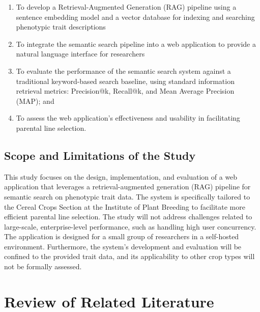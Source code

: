 \documentclass[journal]{./IEEE/IEEEtran}
\begin{document}
\begin{enumerate}
    \item To develop a Retrieval-Augmented Generation (RAG) pipeline using a sentence embedding model and a vector database for indexing and searching phenotypic trait descriptions
    \item To integrate the semantic search pipeline into a web application to provide a natural language interface for researchers
    \item To evaluate the performance of the semantic search system against a traditional keyword-based search baseline, using standard information retrieval metrics: Precision@k, Recall@k, and Mean Average Precision (MAP); and
    \item To assess the web application's effectiveness and usability in facilitating parental line selection.
\end{enumerate}

\subsection{Scope and Limitations of the Study}
This study focuses on the design, implementation, and evaluation of a web application that leverages a retrieval-augmented generation (RAG) pipeline for semantic search on phenotypic trait data. The system is specifically tailored to the Cereal Crops Section at the Institute of Plant Breeding to facilitate more efficient parental line selection. The study will not address challenges related to large-scale, enterprise-level performance, such as handling high user concurrency. The application is designed for a small group of researchers in a self-hosted environment. Furthermore, the system's development and evaluation will be confined to the provided trait data, and its applicability to other crop types will not be formally assessed.

\section{Review of Related Literature}
\end{document}
